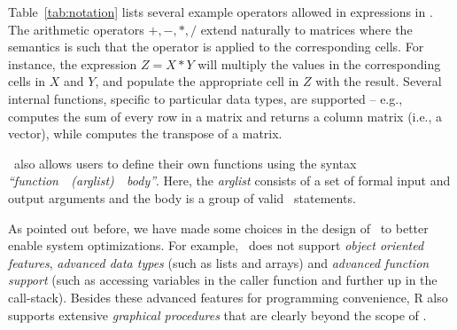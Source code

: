 Table~\ref{tab:notation} lists several example operators allowed in expressions in \dmlr. 
The arithmetic operators $+,-,*,/$ extend naturally to matrices where the semantics is 
such that the operator is applied to the corresponding cells. For instance, the expression 
$Z=X*Y$ will multiply the values in the corresponding cells in $X$ and $Y$, and populate 
the appropriate cell in $Z$ with the result. Several internal functions, specific to 
particular data types, are supported -- e.g.,  computes the sum of every 
row in a matrix and returns a column matrix (i.e., a vector), while  
computes the transpose of a matrix.

\dmlr\ also allows users to define their own functions using the syntax {\textit 
{``function~~(arglist)~~body''}}. Here, the \textit{arglist} consists of a set of formal 
input and output arguments and the body is a group of valid \dmlr\ statements.

 As pointed out before, we have 
made some choices in the design of \dmlr\ to better enable system optimizations. For 
example, \dmlr\ does not support \emph{object oriented features}, \emph{advanced data 
types} (such as lists and arrays) and \emph{advanced function support} (such as accessing 
variables in the caller function and further up in the call-stack). Besides these advanced 
features for programming convenience, R also supports extensive \emph{graphical 
procedures} that are clearly beyond the scope of \dmlr.





